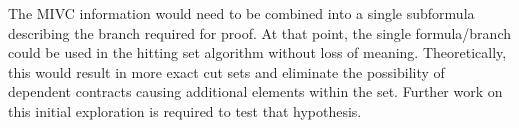 The MIVC information would need to be combined into a single subformula describing the branch required for proof. At that point, the single formula/branch could be used in the hitting set algorithm without loss of meaning. Theoretically, this would result in more exact cut sets and eliminate the possibility of dependent contracts causing additional elements within the set. Further work on this initial exploration is required to test that hypothesis. 






